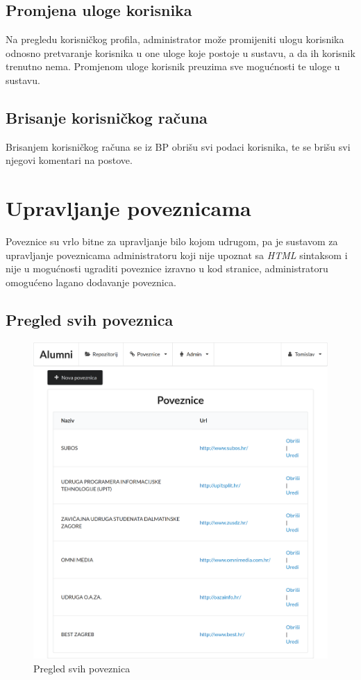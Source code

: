 \documentclass[zavrsni, numeric]{fer}
\begin{document}
\subsection{Promjena uloge korisnika}
Na pregledu korisničkog profila, administrator može promijeniti ulogu korisnika odnosno pretvaranje korisnika u one uloge koje postoje u sustavu, a da ih korisnik trenutno nema. Promjenom uloge korisnik preuzima sve mogućnosti te uloge u sustavu.

\subsection{Brisanje korisničkog računa}
Brisanjem korisničkog računa se iz BP obrišu svi podaci korisnika, te se brišu svi njegovi komentari na postove.

\section{Upravljanje poveznicama}
Poveznice su vrlo bitne za upravljanje bilo kojom udrugom, pa je sustavom za upravljanje poveznicama administratoru koji nije upoznat sa \textit{HTML} sintaksom i nije u mogućnosti ugraditi poveznice izravno u kod stranice, administratoru omogućeno lagano dodavanje poveznica.

\subsection{Pregled svih poveznica}

\begin{figure}[H]
	\centering
	\includegraphics[width=13cm]{slike/poveznice.png}
	\caption{Pregled svih poveznica}
	\label{fig:poveznice}
\end{figure}
\end{document}
